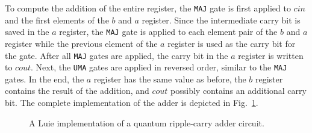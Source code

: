 To compute the addition of the entire register, the \texttt{MAJ} gate is first applied to $cin$ and the first elements of the $b$ and $a$ register. Since the intermediate carry bit is saved in the $a$ register, the \texttt{MAJ} gate is applied to each element pair of the $b$ and $a$ register while the previous element of the $a$ register is used as the carry bit for the gate. After all \texttt{MAJ} gates are applied, the carry bit in the $a$ register is written to $cout$. Next, the \texttt{UMA} gates are applied in reversed order, similar to the \texttt{MAJ} gates. In the end, the $a$ register has the same value as before, the $b$ register contains the result of the addition, and $cout$ possibly contains an additional carry bit. The complete implementation of the adder is depicted in Fig.~\ref{fig:eval_adder_luie}.

\begin{figure}[htp]
    \centering     
    
    \caption{A Luie implementation of a quantum ripple-carry adder circuit.}
    \label{fig:eval_adder_luie}
\end{figure}





